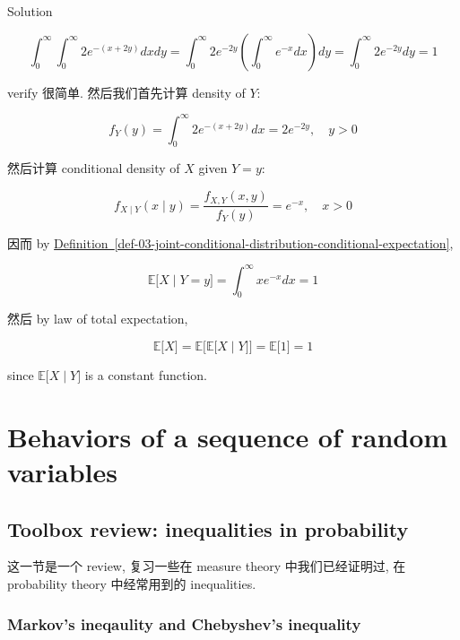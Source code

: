 \documentclass{qlnotes-export}
\begin{document}
\begin{qlsolution}{Solution}

\[\int_{0}^{\infty}\int_{0}^{\infty}2e^{- (x + 2y)}dxdy = \int_{0}^{\infty}2e^{- 2y}\left( {\int_{0}^{\infty}e^{- x}dx} \right)dy = \int_{0}^{\infty}2e^{- 2y}dy = 1\]

verify 很简单. 然后我们首先计算 density of \(Y\):

\[f_{Y}(y) = \int_{0}^{\infty}2e^{- (x + 2y)}dx = 2e^{- 2y},\quad y > 0\]

然后计算 conditional density of \(X\) given \(Y = y\):

\[f_{X \mid Y}(x \mid y) = \frac{f_{X,Y}(x,y)}{f_{Y}(y)} = e^{- x},\quad x > 0\]

因而 by \hyperref[def-03-joint-conditional-distribution-conditional-expectation]{Definition~\ref*{def-03-joint-conditional-distribution-conditional-expectation}},

\[{\mathbb{E}}\lbrack X \mid Y = y\rbrack = \int_{0}^{\infty}xe^{- x}dx = 1\]

然后 by law of total expectation,

\[\left. {\mathbb{E}}\lbrack X\rbrack = {\mathbb{E}}\lbrack{\mathbb{E}}\lbrack X \middle| Y\rbrack\rbrack = {\mathbb{E}}\lbrack 1\rbrack = 1 \right.\]

since \(\left. {\mathbb{E}}\lbrack X \middle| Y\rbrack \right.\) is a constant function.

\end{qlsolution}

\chapter{Behaviors of a sequence of random variables}\label{behaviors-of-a-sequence-of-random-variables}

\section{Toolbox review: inequalities in probability}\label{toolbox-review-inequalities-in-probability}

这一节是一个 review, 复习一些在 measure theory 中我们已经证明过, 在 probability theory 中经常用到的 inequalities.

\subsection{Markov's ineqaulity and Chebyshev's inequality}\label{markovs-ineqaulity-and-chebyshevs-inequality}
\end{document}
